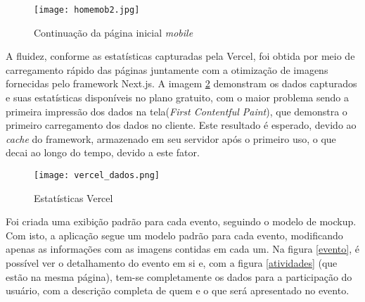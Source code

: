 \begin{figure}[H]
    \caption{\label{homemob2}Continuação da página inicial \textit{mobile}}
    \vspace{5pt}
    \centering
    \texttt{[image: homemob2.jpg]}
    \vspace{5pt}
\end{figure}

A fluidez, conforme as estatísticas capturadas pela Vercel, foi obtida por meio de carregamento rápido das páginas juntamente com a otimização de imagens fornecidas pelo framework Next.js. A imagem \ref{estVercel} demonstram os dados capturados e suas estatísticas disponíveis no plano gratuito, com o maior problema sendo a primeira impressão dos dados na tela(\textit{First Contentful Paint}), que demonstra o primeiro carregamento dos dados no cliente. Este resultado é esperado, devido ao \textit{cache} do framework, armazenado em seu servidor após o primeiro uso, o que decai ao longo do tempo, devido a este fator.

\begin{figure}[H]
    \caption{\label{estVercel}Estatísticas Vercel}
    \vspace{5pt}
    \centering
    \texttt{[image: vercel\_dados.png]}
    \vspace{5pt}
\end{figure}

Foi criada uma exibição padrão para cada evento, seguindo o modelo de mockup. Com isto, a aplicação segue um modelo padrão para cada evento, modificando apenas as informações com as imagens contidas em cada um. Na figura \ref{evento}, é possível ver o detalhamento do evento em si e, com a figura \ref{atividades} (que estão na mesma página), tem-se completamente os dados para a participação do usuário, com a descrição completa de quem e o que será apresentado no evento. 

